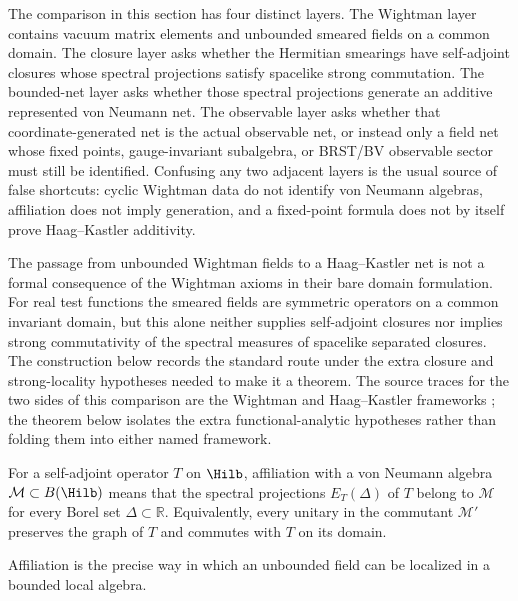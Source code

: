 The comparison in this section has four distinct layers.  The Wightman layer
contains vacuum matrix elements and unbounded smeared fields on a common
domain.  The closure layer asks whether the Hermitian smearings have
self-adjoint closures whose spectral projections satisfy spacelike strong
commutation.  The bounded-net layer asks whether those spectral projections
generate an additive represented von Neumann net.  The observable layer asks
whether that coordinate-generated net is the actual observable net, or instead
only a field net whose fixed points, gauge-invariant subalgebra, or BRST/BV
observable sector must still be identified.  Confusing any two adjacent
layers is the usual source of false shortcuts: cyclic Wightman data do not
identify von Neumann algebras, affiliation does not imply generation, and a
fixed-point formula does not by itself prove Haag--Kastler additivity.

The passage from unbounded Wightman fields to a Haag--Kastler net is not a
formal consequence of the Wightman axioms in their bare domain formulation.
For real test functions the smeared fields are symmetric operators on a common
invariant domain, but this alone neither supplies self-adjoint closures nor
implies strong commutativity of the spectral measures of spacelike separated
closures.  The construction below records the standard route under the extra
closure and strong-locality hypotheses needed to make it a theorem.
The source traces for the two sides of this comparison are the Wightman and
Haag--Kastler frameworks
\cite{Wightman1956,StreaterWightman1964,HaagKastler1964}; the theorem below
isolates the extra functional-analytic hypotheses rather than folding them
into either named framework.

\begin{definition}
\label{def:operator-affiliation-local-algebra}
For a self-adjoint operator \(T\) on \(\Hilb\), affiliation with a von
Neumann algebra \(\mathcal M\subset B(\Hilb)\) means that the spectral
projections \(E_T(\Delta)\) of \(T\) belong to \(\mathcal M\) for every Borel
set \(\Delta\subset\mathbb R\).  Equivalently, every unitary in the commutant
\(\mathcal M'\) preserves the graph of \(T\) and commutes with \(T\) on its
domain.
\end{definition}

Affiliation is the precise way in which an unbounded field can be localized
in a bounded local algebra.

